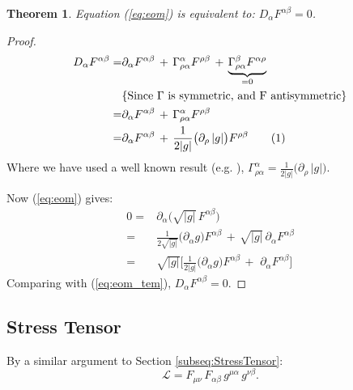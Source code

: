 \documentclass[]{article}
\newcommand{\Lagr}{\mathscr{L}}
\newcommand\numberthis{\addtocounter{equation}{1}\tag{\theequation}}
\newtheorem{theorem}{Theorem}
\begin{document}
\begin{theorem}
	Equation (\ref{eq:eom}) is equivalent to: $D_\alpha F^{\alpha\beta} = 0$.
\end{theorem}
\begin{proof}
	\begin{align*}
	D_\alpha F^{\alpha\beta} =& \partial_\alpha F^{\alpha\beta} \, + \, \Gamma^{\alpha}_{\rho\alpha}F^{\rho\beta}\,+\,\underbrace{\Gamma^\beta_{\rho\alpha}F^{\alpha\rho}}_{=0}\\
	&\text{\{Since $\Gamma$ is symmetric, and F antisymmetric\}} \\
	=& \partial_\alpha F^{\alpha\beta} \, + \, \Gamma^{\alpha}_{\rho\alpha}F^{\rho\beta}\\
	=& \partial_\alpha F^{\alpha\beta} \, + \, \frac{1}{2|g|}\big(\partial_\rho \, |g|\big)F^{\rho\beta} \numberthis \label{eq:eom_tem}
	\end{align*}
	Where we have used a well known result (e.g. \cite[equation (3.11)]{abs1965}), $\Gamma^{\alpha}_{\rho\alpha}=\frac{1}{2|g|}\big(\partial_\rho \, |g|\big)$.
	
	Now (\ref{eq:eom}) gives:
	\begin{align*}
	0 =& \partial_\alpha \big(\sqrt{|g|} \, F^{\alpha\beta} \big)\\
	=& \frac{1}{2\sqrt{|g|}} \big(\partial_\alpha g\big) F^{\alpha\beta} \, + \, \sqrt{|g|} \, \partial_\alpha F^{\alpha\beta}\\
	=& \sqrt{|g|} \big[\frac{1}{2|g|} \big(\partial_\alpha g\big) F^{\alpha\beta} \, + \, \, \partial_\alpha F^{\alpha\beta}\big]
	\end{align*}
	Comparing with (\ref{eq:eom_tem}),  $D_\alpha F^{\alpha\beta} = 0$.
\end{proof}
\subsection{Stress Tensor}
By a similar argument to Section \ref{subseq:StressTensor}:
\begin{equation}
\Lagr= F_{\mu\nu}\, F_{\alpha\beta} \, g^{\mu\alpha} \, g^{\nu\beta}.
\label {eq:a}
\end{equation}
\end{document}
